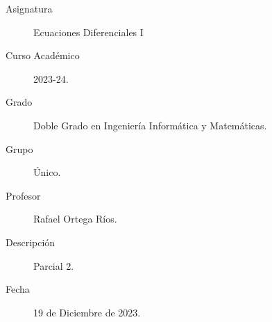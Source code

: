 \documentclass[12pt]{article}
\begin{document}

    
    

    \begin{description}
        \item[Asignatura] Ecuaciones Diferenciales I
        \item[Curso Académico] 2023-24.
        \item[Grado] Doble Grado en Ingeniería Informática y Matemáticas.
        \item[Grupo] Único.
        \item[Profesor] Rafael Ortega Ríos.
        \item[Descripción] Parcial 2.
        \item[Fecha] 19 de Diciembre de 2023.
    \end{description}
    \newpage
\end{document}
